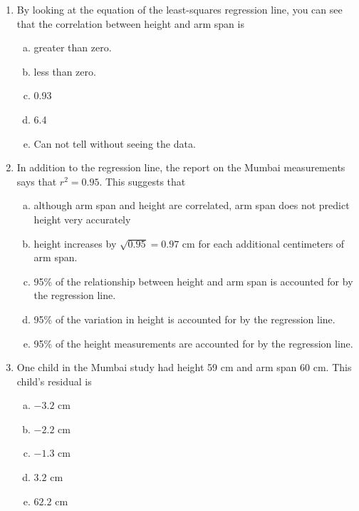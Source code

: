 \documentclass[a4paper,12pt,twoside]{book}
\begin{document}
\begin{enumerate}
     \textit{The following 5 problems refer to the following setting.}
    
    Measurements on young children in Mumbai, India, found this least-squares line for predicting height y from arm span x:
    $$\hat{y} = 6.4 + 0.93\, x$$
    Measurements are in centimeters (cm).
    \vspace{0.3cm}
    
    \item By looking at the equation of the least-squares regression line, you can see that the correlation between height and arm span is
    
        \begin{enumerate}[(a)]
            \item greater than zero. 
            \item less than zero.
            \item 0.93
            \item 6.4
            \item Can not tell without seeing the data.
        \end{enumerate}
        \vspace{0.3cm}
        
    \item In addition to the regression line, the report on the Mumbai measurements says that $r^2 = 0.95$. This  suggests that
        \begin{enumerate}[(a)]
            \item although arm span and height are correlated, arm span does not predict height very accurately
            \item height increases by $\sqrt{0.95} = 0.97$ cm for each additional centimeters of arm span.
            \item 95\% of the relationship between height and arm span is accounted for by the regression line.
            \item 95\% of the variation in height is accounted for by the regression line.
            \item 95\% of the height measurements are accounted for by the regression line.
        \end{enumerate}
        \vspace{0.3cm}
        
    \item One child in the Mumbai study had height 59 cm and arm span 60 cm. This child’s residual is
    \begin{multicols}{5}
        \begin{enumerate}[(a)]
            \item $-3.2$ cm
            \item $-2.2$ cm
            \item $-1.3$ cm
            \item $3.2$ cm
            \item $62.2$ cm
        \end{enumerate}
     \end{multicols}
     \vspace{0.3cm}
     

\end{enumerate}
\end{document}
